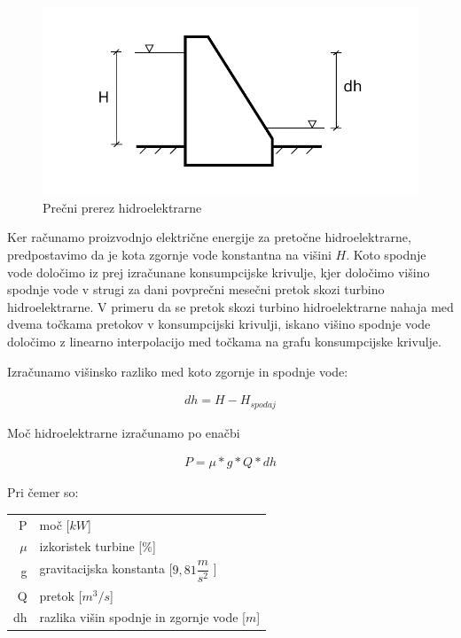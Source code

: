 \begin{figure}[ht!]
	\begin{centering}
		\includegraphics{slike/electricityProduction/powerplant_crossSection.pdf}
		\caption{Prečni prerez hidroelektrarne}
	\end{centering}
\end{figure}

Ker računamo proizvodnjo električne energije za pretočne hidroelektrarne, predpostavimo da je kota zgornje vode konstantna na višini $H$. Koto spodnje vode določimo iz prej izračunane konsumpcijske krivulje, kjer določimo višino spodnje vode v strugi za dani povprečni mesečni pretok skozi turbino hidroelektrarne. V primeru da se pretok skozi turbino hidroelektrarne nahaja med dvema točkama pretokov v konsumpcijski krivulji, iskano višino spodnje vode določimo z linearno interpolacijo med točkama na grafu konsumpcijske krivulje.

Izračunamo višinsko razliko med koto zgornje in spodnje vode:

\begin{ceqn}
\begin{align}
dh = H - H_{spodaj}
\end{align}
\end{ceqn}

Moč hidroelektrarne izračunamo po enačbi

\begin{ceqn}
\begin{align}
P = \mu * g * Q * dh
\end{align}
\end{ceqn}

Pri čemer so:
\begin{table}[htb!]
	\begin{tabular}{r|p{10cm}}
		P & moč [$kW$]\\
		$\mu$ & izkoristek turbine [\%]\\
		g & gravitacijska konstanta [$9,81\dfrac{m}{s^{2}}$ ] \\
		Q & pretok [$m^{3}/s$]\\
		dh & razlika višin spodnje in zgornje vode [$m$]
	\end{tabular}
\end{table}



